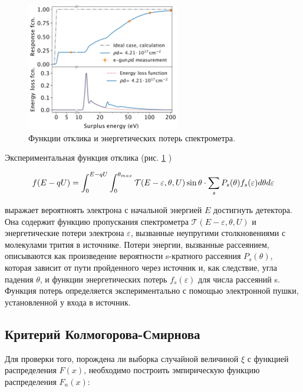 ﻿\documentclass[a4paper,14pt]{extarticle}
\begin{document}
    \begin{figure}
        \center
        \includegraphics[width=0.6\textwidth]{response.png}
        \captionsetup{width=0.8\textwidth}
        \caption{Функции отклика и энергетических потерь спектрометра.}
        \label{fig:response}
    \end{figure}
    
    Экспериментальная функция отклика (рис. \ref{fig:response} \cite{katrin_status})
    
    \begin{equation}
      f(E-qU) = \int_0^{E-qU} \int_0^{\theta_{max}} \mathcal T(E - \varepsilon, \theta, U) \sin\theta \\
      \cdot \displaystyle\sum_s P_s(\theta)f_s(\varepsilon) d\theta d\varepsilon
    \end{equation}
    
    \noindent выражает вероятноять электрона с начальной энергией $E$ достигнуть детектора. Она содержит функцию 
    пропускания спектрометра $\mathcal T(E - \varepsilon, \theta, U)$ и энергетические потери электрона
    $\varepsilon$, вызванные неупругими столкновениями с молекулами трития в источнике. Потери энергии, вызванные
    рассеянием, описываются как произведение вероятности s-кратного рассеяния $P_s(\theta)$, которая зависит от пути 
    пройденного через источник и, как следствие, угла падения $\theta$, и функции энергетических потерь 
    $f_s(\varepsilon)$ для числа рассеяний s. Функция потерь определяется экспериментально с помощью электронной
    пушки, установленной у входа в источник.
    
    
    
    
    \subsection{Критерий Колмогорова-Смирнова}
    Для проверки того, порождена ли выборка случайной величиной $\xi$ с функцией распределения $F(x)$, необходимо 
    построить эмпирическую функцию распределения $F_n(x)$:
    
\end{document}
